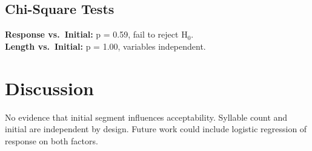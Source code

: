 \documentclass[11pt]{article}
\begin{document}
\subsection{Chi-Square Tests}
\textbf{Response vs.\ Initial:} p = 0.59, fail to reject H$_0$.\\
\textbf{Length vs.\ Initial:} p = 1.00, variables independent.

\section{Discussion}
No evidence that initial segment influences acceptability. Syllable count and initial are independent by design. Future work could include logistic regression of response on both factors.
\end{document}
